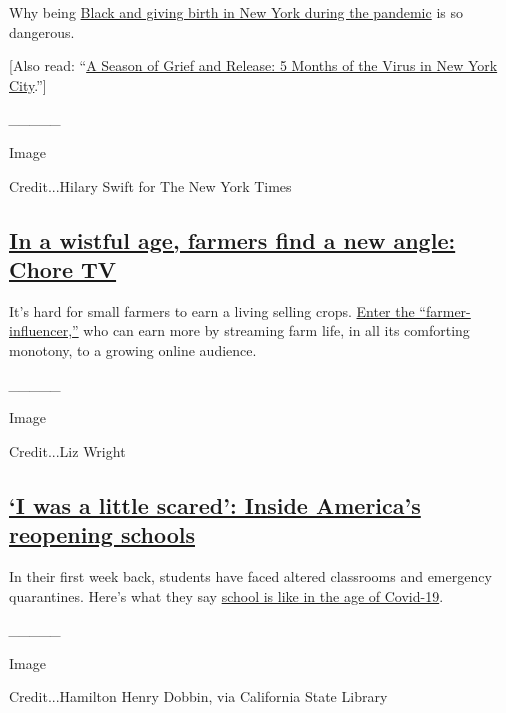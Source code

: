 Why being
\href{https://www.nytimes.com/2020/08/06/nyregion/childbirth-Covid-Black-mothers.html}{Black
and giving birth in New York during the pandemic} is so dangerous.

{[}Also read:
``\href{https://www.nytimes.com/2020/08/07/style/coronavirus-nyc-historic-season.html}{A
Season of Grief and Release: 5 Months of the Virus in New York
City}.''{]}

\emph{\_\_\_\_\_}

Image

Credit...Hilary Swift for The New York Times

\hypertarget{in-a-wistful-age-farmers-find-a-new-angle-chore-tv}{%
\subsection{\texorpdfstring{\href{https://www.nytimes.com/2020/08/07/us/farmer-influencer-youtube.html}{In
a wistful age, farmers find a new angle: Chore
TV}}{In a wistful age, farmers find a new angle: Chore TV}}\label{in-a-wistful-age-farmers-find-a-new-angle-chore-tv}}

It's hard for small farmers to earn a living selling crops.
\href{https://www.nytimes.com/2020/08/07/us/farmer-influencer-youtube.html}{Enter
the ``farmer-influencer,''} who can earn more by streaming farm life, in
all its comforting monotony, to a growing online audience.

\emph{\_\_\_\_\_}

Image

Credit...Liz Wright

\hypertarget{i-was-a-little-scared-inside-americas-reopening-schools}{%
\subsection{\texorpdfstring{\href{https://www.nytimes.com/2020/08/06/us/coronavirus-students.html}{`I
was a little scared': Inside America's reopening
schools}}{`I was a little scared': Inside America's reopening schools}}\label{i-was-a-little-scared-inside-americas-reopening-schools}}

In their first week back, students have faced altered classrooms and
emergency quarantines. Here's what they say
\href{https://www.nytimes.com/2020/08/06/us/coronavirus-students.html}{school
is like in the age of Covid-19}.

\emph{\_\_\_\_\_}

Image

Credit...Hamilton Henry Dobbin, via California State Library

